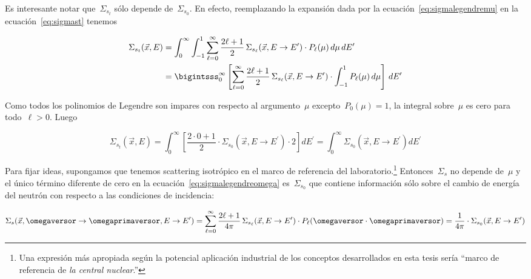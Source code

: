 \bigskip

Es interesante notar que~$\Sigma_{s_t}$ sólo depende de~$\Sigma_{s_0}$. En efecto, reemplazando la expansión dada por la ecuación~\eqref{eq:sigmalegendremu} en la ecuación~\eqref{eq:sigmast} tenemos

\begin{align*}
 \Sigma_{s_t}(\vec{x}, E) &=
 \int_{0}^{\infty} \int_{-1}^{1} \sum_{\ell=0}^{\infty} \frac{2\ell + 1}{2} \, \Sigma_{s_\ell}(\vec{x}, E \rightarrow E^{\prime}) \cdot P_\ell(\mu) \, d\mu \, dE^\prime \\
 &= 
\bigintsss_{0}^{\infty} \left[ \sum_{\ell=0}^{\infty} \frac{2\ell + 1}{2} \, \Sigma_{s_\ell}(\vec{x}, E \rightarrow E^{\prime}) \cdot \int_{-1}^{1} P_\ell(\mu) \, d\mu \right] \, dE^\prime 
\end{align*}


Como todos los polinomios de Legendre son impares con respecto al argumento~$\mu$ excepto~$P_0(\mu)=1$, la integral sobre~$\mu$ es cero para todo~$\ell >0$. Luego

\begin{equation}\label{eq:sigmastys0}
 \Sigma_{s_t}(\vec{x}, E) = 
\int_{0}^{\infty} \left[ \frac{2 \cdot 0 + 1}{2} \cdot \Sigma_{s_0}(\vec{x}, E \rightarrow E^{\prime}) \cdot 2 \right] dE^\prime
=
\int_{0}^{\infty} \Sigma_{s_0}(\vec{x}, E \rightarrow E^{\prime}) dE^\prime
\end{equation}


\bigskip

Para fijar ideas, supongamos que tenemos scattering isotrópico en el marco de referencia del laboratorio.\footnote{Una expresión más apropiada según la potencial aplicación industrial de los conceptos desarrollados en esta tesis sería “marco de referencia de \emph{la central nuclear}.”} Entonces~$\Sigma_s$ no depende de~$\mu$ y el único término diferente de cero en la ecuación~\eqref{eq:sigmalegendreomega} es~$\Sigma_{s_0}$ que contiene información sólo sobre el cambio de energía del neutrón con respecto a las condiciones de incidencia:

\begin{equation}\label{eq:sigmas0}
\Sigma_s(\vec{x}, \omegaversor \rightarrow \omegaprimaversor, E \rightarrow E^\prime) = \sum_{\ell=0}^{\infty} \frac{2\ell + 1}{4\pi} \, \Sigma_{s_\ell}(\vec{x}, E \rightarrow E^{\prime}) \cdot P_\ell(\omegaversor \cdot \omegaprimaversor)  
= 
\frac{1}{4\pi} \cdot \Sigma_{s_0}(\vec{x}, E\rightarrow E^\prime)
\end{equation}

